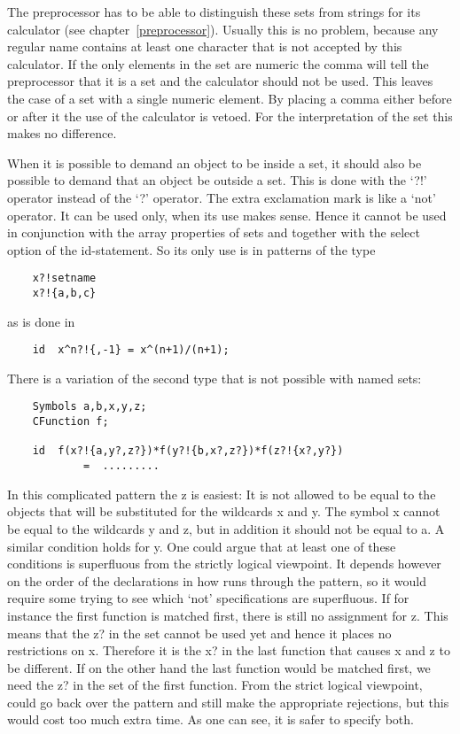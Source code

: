 The preprocessor has to be able to distinguish these sets from strings for 
its calculator (see 
chapter~\ref{preprocessor}). Usually this is no problem, because any 
regular name contains at least one character that is not accepted by this 
calculator. If the only elements in the set are numeric the 
comma will tell the preprocessor that it is a set and the 
calculator should not be used. This leaves the case of a set with a single 
numeric element. By placing a comma either before or after it the use of 
the calculator is vetoed. For the interpretation of the set this makes no 
difference.

When it is possible to demand an object to be inside a 
set, it should also be possible to demand that an object 
be outside a set. This is done with the `?!' operator 
instead of the `?' operator. The extra exclamation mark 
is like a `not' operator. It can be used only, when its use makes sense. 
Hence it cannot be used in conjunction with the array properties of sets 
and together with the select option of the id-statement. So its only use is 
in patterns of the type
\begin{verbatim}
    x?!setname
    x?!{a,b,c}
\end{verbatim}
as is done in
\begin{verbatim}
    id  x^n?!{,-1} = x^(n+1)/(n+1);
\end{verbatim}
There is a variation of the second type that is not possible with named 
sets:
\begin{verbatim}
    Symbols a,b,x,y,z;
    CFunction f;
    
    id  f(x?!{a,y?,z?})*f(y?!{b,x?,z?})*f(z?!{x?,y?})
            =  .........
\end{verbatim}
In this complicated pattern the z is easiest: It is not allowed to be equal 
to the objects that will be substituted for the wildcards x and y. The 
symbol x cannot be equal to the wildcards y and z, but in addition it 
should not be equal to a. A similar condition holds for y. One could argue 
that at least one of these conditions is superfluous from the strictly 
logical viewpoint. It depends however on the order of the declarations in 
how {\FORM} runs through the pattern, so it would require some trying to 
see which `not' specifications are superfluous. If for instance the first 
function is matched first, there is still no assignment for z. This means 
that the z? in the set cannot be used yet and hence it places no 
restrictions on x. Therefore it is the x? in the last function that causes 
x and z to be different. If on the other hand the last function would be 
matched first, we need the z? in the set of the first function. From the 
strict logical viewpoint, {\FORM} could go back over the pattern and still 
make the appropriate rejections, but this would cost too much extra time. 
As one can see, it is safer to specify both.

